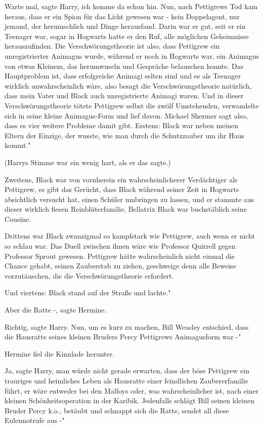 \glqq{}Warte mal\grqq{}, sagte Harry, \glqq{}ich komme da schon hin. Nun, nach
Pettigrews Tod kam heraus, dass er ein Spion für das Licht gewesen war - kein
Doppelagent, nur jemand, der herumschlich und Dinge herausfand. Darin war er
gut, seit er ein Teenager war, sogar in Hogwarts hatte er den Ruf, alle
möglichen Geheimnisse herauszufinden. Die Verschwörungstheorie ist also, dass
Pettigrew ein unregistrierter Animagus wurde, während er noch in Hogwarts war,
ein Animagus von etwas Kleinem, das herumwuseln und Gespräche belauschen konnte.
Das Hauptproblem ist, dass erfolgreiche Animagi selten sind und es als Teenager
wirklich unwahrscheinlich wäre, also besagt die Verschwörungstheorie natürlich,
dass mein Vater und Black auch unregistrierte Animagi waren. Und in dieser
Verschwörungstheorie tötete Pettigrew selbst die zwölf Umstehenden, verwandelte
sich in seine kleine Animagus-Form und lief davon. Michael Shermer sagt also,
dass es vier weitere Probleme damit gibt. Erstens: Black war neben meinen Eltern
der Einzige, der wusste, wie man durch die Schutzzauber um ihr Haus kommt."

(Harrys Stimme war ein wenig hart, als er das sagte.)

\glqq{}Zweitens, Black war von vornherein ein wahrscheinlicherer Verdächtiger als
Pettigrew, es gibt das Gerücht, dass Black während seiner Zeit in Hogwarts
absichtlich versucht hat, einen Schüler umbringen zu lassen, und er stammte aus
dieser wirklich fiesen Reinblüterfamilie, Bellatrix Black war buchstäblich seine
Cousine.

Drittens war Black zwanzigmal so kampfstark wie Pettigrew, auch wenn er nicht so
schlau war. Das Duell zwischen ihnen wäre wie Professor Quirrell gegen Professor
Sprout gewesen. Pettigrew hätte wahrscheinlich nicht einmal die Chance gehabt,
seinen Zauberstab zu ziehen, geschweige denn alle Beweise vorzutäuschen, die die
Verschwörungstheorie erfordert.

Und viertens: Black stand auf der Straße und lachte."

\glqq{}Aber die Ratte -\grqq{}, sagte Hermine.

\glqq{}Richtig\grqq{}, sagte Harry. \glqq{}Nun, um es kurz zu machen, Bill Weasley
entschied, dass die Hausratte seines kleinen Bruders Percy Pettigrews
Animagusform war -"

Hermine fiel die Kinnlade herunter.

\glqq{}Ja\grqq{}, sagte Harry, \glqq{}man würde nicht gerade erwarten, dass der
böse Pettigrew ein trauriges und heimliches Leben als Hausratte einer
feindlichen Zaubererfamilie führt, er wäre entweder bei den Malfoys oder, was
wahrscheinlicher ist, nach einer kleinen Schönheitsoperation in der Karibik.
Jedenfalls schlägt Bill seinen kleinen Bruder Percy k.o., betäubt und schnappt
sich die Ratte, sendet all diese Eulennotrufe aus -"

